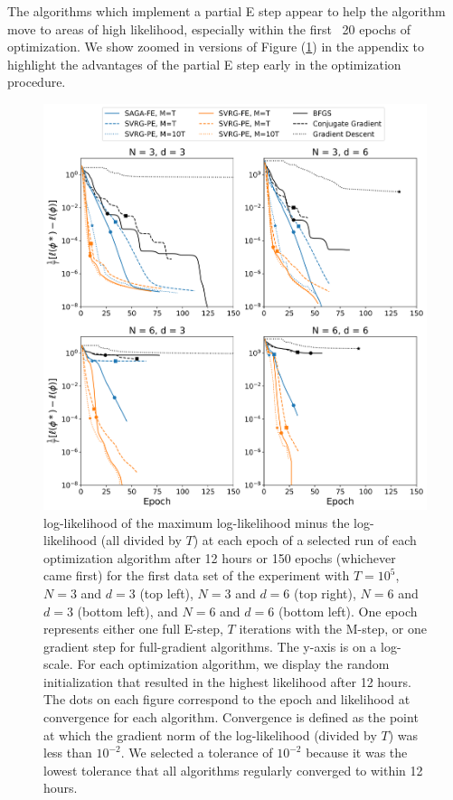 The algorithms which implement a partial E step appear to help the algorithm move to areas of high likelihood, especially within the first ~20 epochs of optimization. We show zoomed in versions of Figure (\ref{fig:ll_trace_sim}) in the appendix to highlight the advantages of the partial E step early in the optimization procedure.
%
\begin{figure}
    \centering
    \includegraphics[width=6.5in]{../plt/log-like_v_epoch_T-100000-000.png}
    \caption{log-likelihood of the maximum log-likelihood minus the log-likelihood (all divided by $T$) at each epoch of a selected run of each optimization algorithm after 12 hours or 150 epochs (whichever came first) for the first data set of the experiment with $T=10^{5}$, $N=3$ and $d=3$ (top left), $N=3$ and $d=6$ (top right), $N=6$ and $d=3$ (bottom left), and $N=6$ and $d=6$ (bottom left). One epoch represents either one full E-step, $T$ iterations with the M-step, or one gradient step for full-gradient algorithms. The y-axis is on a log-scale. For each optimization algorithm, we display the random initialization that resulted in the highest likelihood after 12 hours. The dots on each figure correspond to the epoch and likelihood at convergence for each algorithm. Convergence is defined as the point at which the gradient norm of the log-likelihood (divided by $T$) was less than $10^{-2}$. We selected a tolerance of $10^{-2}$ because it was the lowest tolerance that all algorithms regularly converged to within 12 hours.}
    \label{fig:ll_trace_sim}
\end{figure}
